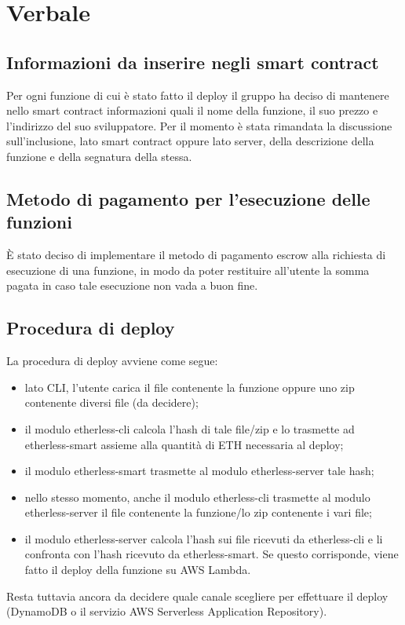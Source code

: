 \section{Verbale}

	\subsection{Informazioni da inserire negli smart contract}
	Per ogni funzione di cui è stato fatto il deploy il gruppo ha deciso di mantenere nello smart contract informazioni quali il nome della funzione, il suo prezzo e l'indirizzo del suo sviluppatore. Per il momento è stata rimandata la discussione sull'inclusione, lato smart contract oppure lato server, della descrizione della funzione e della segnatura della stessa.
	
	\subsection{Metodo di pagamento per l'esecuzione delle funzioni}
	È stato deciso di implementare il metodo di pagamento escrow alla richiesta di esecuzione di una funzione, in modo da poter restituire all'utente la somma pagata in caso tale esecuzione non vada a buon fine.
	
	\subsection{Procedura di deploy}
	La procedura di deploy avviene come segue:
		\begin{itemize}
			\item lato CLI, l'utente carica il file contenente la funzione oppure uno zip contenente diversi file (da decidere);
			\item il modulo etherless-cli calcola l'hash di tale file/zip e lo trasmette ad etherless-smart assieme alla quantità di ETH necessaria al deploy;
			\item il modulo etherless-smart trasmette al modulo etherless-server tale hash;
			\item nello stesso momento, anche il modulo etherless-cli trasmette al modulo etherless-server il file contenente la funzione/lo zip contenente i vari file;
			\item il modulo etherless-server calcola l'hash sui file ricevuti da etherless-cli e li confronta con l'hash ricevuto da etherless-smart. Se questo corrisponde, viene fatto il deploy della funzione su AWS Lambda.	
		\end{itemize}
	Resta tuttavia ancora da decidere quale canale scegliere per effettuare il deploy (DynamoDB o il servizio AWS Serverless Application Repository).
	
